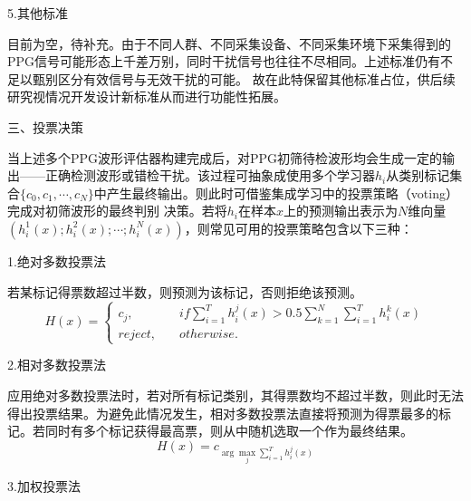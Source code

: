 5.其他标准

目前为空，待补充。由于不同人群、不同采集设备、不同采集环境下采集得到的PPG信号可能形态上千差万别，同时干扰信号也往往不尽相同。上述标准仍有不足以甄别区分有效信号与无效干扰的可能。
故在此特保留其他标准占位，供后续研究视情况开发设计新标准从而进行功能性拓展。

三、投票决策

当上述多个PPG波形评估器构建完成后，对PPG初筛待检波形均会生成一定的输出——正确检测波形或错检干扰。该过程可抽象成使用多个学习器$h_i$从类别标记集合$\{c_0,c_1,\cdots,c_N\}$中产生最终输出。则此时可借鉴集成学习中的投票策略（voting）完成对初筛波形的最终判别
决策\cite{Zhou2016}。若将$h_i$在样本$x$上的预测输出表示为$N$维向量$(h_i^1(x);h_i^2(x);\cdots;h_i^N(x))$，则常见可用的投票策略包含以下三种\cite{Kittler1998,Zhou2016}：

1.绝对多数投票法

若某标记得票数超过半数，则预测为该标记，否则拒绝该预测。
\begin{equation}
    \label{equ:mvoting}
    H(x)=
    \left \{
    \begin{aligned}
        c_j,&\quad if \sum_{i=1}^T{h_i^j(x)}>0.5\sum_{k=1}^N{\sum_{i=1}^T}{h_i^k(x)}\\
        reject,&\quad otherwise.
    \end{aligned}
    \right.
\end{equation}

2.相对多数投票法

应用绝对多数投票法时，若对所有标记类别，其得票数均不超过半数，则此时无法得出投票结果。为避免此情况发生，相对多数投票法直接将预测为得票最多的标记。若同时有多个标记获得最高票，则从中随机选取一个作为最终结果。
\begin{equation}
    \label{equ:pvoting}
    H(x)=c_{\arg \max\limits_{j} \sum_{i=1}^T{h_i^j(x)}}
\end{equation}

3.加权投票法

